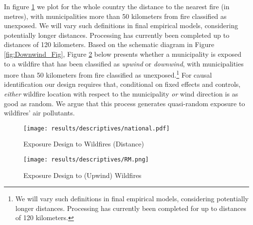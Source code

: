 \documentclass[11pt]{article}
\begin{document}
\begin{spacing}{1.3}
 In figure \ref{fig:design} we plot for the whole country the distance to the nearest fire (in metres), with municipalities more than 50 kilometers from fire classified as unexposed. We will vary such definitions in final empirical models, considering potentially longer distances.  Processing has currently been completed up to distances of 120 kilometers.  
Based on the schematic diagram in Figure \ref{fig:Downwind_Fig}, Figure \ref{fig:design2} below presents whether a municipality is exposed to a wildfire that has been classified as \textit{upwind} or \textit{downwind}, with municipalities more than 50 kilometers from fire classified as unexposed.\footnote{We will vary such definitions in final empirical models, considering potentially longer distances.  Processing has currently been completed for up to distances of 120 kilometers.} For causal identification our design requires that, conditional on fixed effects and controls, \emph{either} wildfire location with respect to the municipality \emph{or} wind direction is as good as random. We argue that this process generates quasi-random exposure to wildfires' air pollutants.

\begin{figure}
    \centering
    \texttt{[image: results/descriptives/national.pdf]}
    \caption{Exposure Design to Wildfires (Distance)}
    \label{fig:design}
\end{figure}    

\begin{figure}
    \centering
    \texttt{[image: results/descriptives/RM.png]}
    \caption{Exposure Design to (Upwind) Wildfires}
    \label{fig:design2}
\end{figure}    


\end{spacing}
\end{document}

